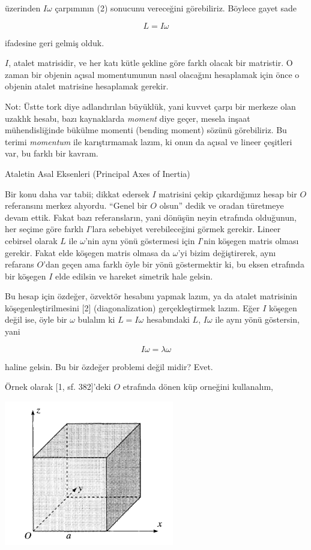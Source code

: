 \documentclass[12pt,fleqn]{article}\usepackage{../../common}
\begin{document}
üzerinden $I \omega$ çarpımının (2) sonucunu vereceğini görebiliriz. Böylece
gayet sade

$$
L = I \omega
$$

ifadesine geri gelmiş olduk.

$I$, atalet matrisidir, ve her katı kütle şekline göre farklı olacak bir
matristir. O zaman bir objenin açısal momentumunun nasıl olacağını hesaplamak
için önce o objenin atalet matrisine hesaplamak gerekir.

Not: Üstte tork diye adlandırılan büyüklük, yani kuvvet çarpı bir merkeze olan
uzaklık hesabı, bazı kaynaklarda {\em moment} diye geçer, mesela inşaat
mühendisliğinde bükülme momenti (bending moment) sözünü görebiliriz.
Bu terimi {\em momentum} ile karıştırmamak lazım, ki onun da açısal ve
lineer çeşitleri var, bu farklı bir kavram.

Ataletin Asal Eksenleri (Principal Axes of Inertia) 

Bir konu daha var tabii; dikkat edersek $I$ matrisini çekip çıkardığımız hesap
bir $O$ referansını merkez alıyordu. ``Genel bir $O$ olsun'' dedik ve oradan
türetmeye devam ettik. Fakat bazı referansların, yani dönüşün neyin etrafında
olduğunun, her seçime göre farklı $I$'lara sebebiyet verebileceğini görmek
gerekir. Lineer cebirsel olarak $L$ ile $\omega$'nin aynı yönü göstermesi için
$I$'nin köşegen matris olması gerekir. Fakat elde köşegen matris olmasa da
$\omega$'yi bizim değiştirerek, aynı refarans $O$'dan geçen ama farklı öyle bir
yönü göstermektir ki, bu eksen etrafında bir köşegen $I$ elde edilsin ve hareket
simetrik hale gelsin.

Bu hesap için özdeğer, özvektör hesabını yapmak lazım, ya da atalet matrisinin
köşegenleştirilmesini [2] (diagonalization) gerçekleştirmek lazım. Eğer $I$
köşegen değil ise, öyle bir $\omega$ bulalım ki $L = I \omega$ hesabındaki
$L$, $I \omega$ ile aynı yönü göstersin, yani

$$
I\omega = \lambda \omega
$$

haline gelsin. Bu bir özdeğer problemi değil midir? Evet. 

Örnek olarak [1, sf. 382]'deki $O$ etrafında dönen küp orneğini kullanalım,

\includegraphics[width=20em]{phy_005_basics_04_01.png}
\end{document}
